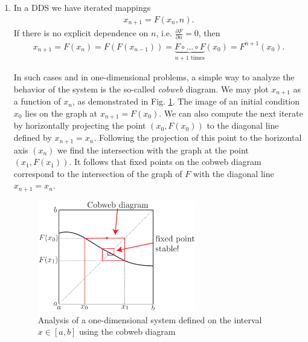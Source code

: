 \begin{enumerate}
	\item In a DDS we have iterated mappings 
	\begin{align}
		\boxed{ {x}_{n+1} = F( {x}_n , n).}	
	\end{align}
	If there is no explicit dependence on $n$, i.e. $\frac{\partial F}{\partial n} = 0$, then 
	\begin{align}
		\boxed{  {x}_{n+1}=F( {x}_n) = F(F( {x}_{n-1})) = \underbrace{F \circ \ldots \circ F}_{n+1 \textrm{ times} }( {x}_0) = F^{n+1}( {x}_0).}
	\end{align}
\begin{ex}
	In such cases and in one-dimensional problems, a simple way to analyze the behavior of the system is the so-called \textit{cobweb} diagram. We may plot $x_{n+1}$ as a function of $x_{n}$, as demonstrated in Fig. \ref{fig:cobweb}. The image of an initial condition $x_0$ lies on the graph at $x_{n+1}=F(x_0)$. We can also compute the next iterate by horizontally projecting the point $(x_0, F(x_0))$ to the diagonal line defined by $x_{n+1}= x_n$. Following the projection of this point to the horizontal axis $(x_n)$ we find the intersection with the graph at the point $(x_1, F(x_1))$. It follows that fixed points on the cobweb diagram correspond to the intersection of the graph of $F$ with the diagonal line $x_{n+1}= x_n$.
	\begin{figure}[h!]
	\centering
	\includegraphics[width = 0.65\textwidth]{figures/intro/1DDS.pdf}
	\caption{Analysis of a one-dimensional system defined on the interval $x\in [a,b]$ using the cobweb diagram} \label{fig:cobweb}
\end{figure}
\end{ex}


\end{enumerate}
